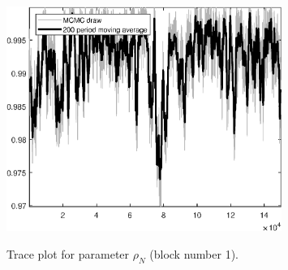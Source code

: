 \begin{figure}[H]
\centering
  \includegraphics[width=0.8\textwidth]{BRS_gen/graphs/TracePlot_rho_N_blck_1}\\
    \caption{Trace plot for parameter ${\rho_N}$ (block number 1).}
\end{figure}
